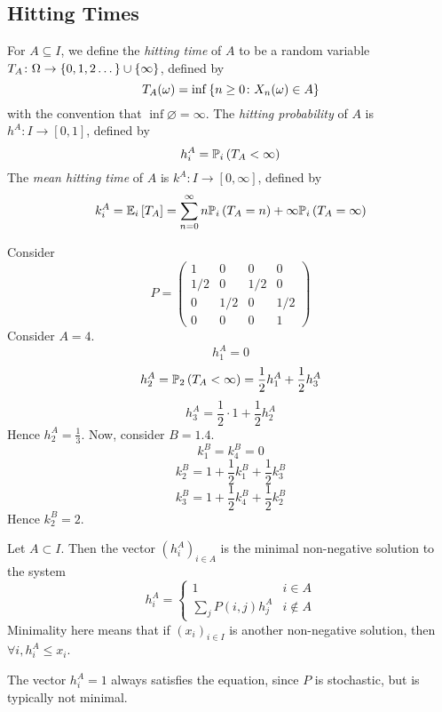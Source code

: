 \subsection{Hitting Times}
\begin{definition}
	For \( A \subseteq I \), we define the \textit{hitting time} of \( A \) to be a random variable \( T_A \colon \Omega \to \qty{0,1,2\dots} \cup \{ \infty \} \), defined by
	\[
		T_A(\omega) = \inf \qty{n \geq 0 \colon X_n(\omega) \in A}
	\]
	with the convention that \( \inf \varnothing = \infty \).
	The \textit{hitting probability} of \( A \) is \( h^A \colon I \to [0,1] \), defined by
	\[
		h_i^A = \mathbb{P}_{i}\left({T_A < \infty}\right)
	\]
	The \textit{mean hitting time} of \( A \) is \( k^A \colon I \to [0,\infty] \), defined by
	\[
		k_i^A = \mathbb{E}_{i}\left[{T_A}\right] = \sum_{n=0}^\infty n \mathbb{P}_{i}\left({T_A = n}\right) + \infty \mathbb{P}_{i}\left({T_A = \infty}\right)
	\]
\end{definition}
\begin{example}
	Consider
	\[
		P = \begin{pmatrix}
			1   & 0   & 0   & 0   \\
			1/2 & 0   & 1/2 & 0   \\
			0   & 1/2 & 0   & 1/2 \\
			0   & 0   & 0   & 1
		\end{pmatrix}
	\]
	Consider \( A = \qty{4} \).
	\[
		h_1^A = 0
	\]
	\[
		h_2^A = \mathbb{P}_{2}\left({T_A < \infty}\right) = \frac{1}{2} h_1^A + \frac{1}{2} h_3^A
	\]
	\[
		h_3^A = \frac{1}{2} \cdot 1 + \frac{1}{2} h_2^A
	\]
	Hence \( h_2^A = \frac{1}{3} \).
	Now, consider \( B = \qty{1,4} \).
	\[
		k_1^B = k_4^B = 0
	\]
	\[
		k_2^B = 1 + \frac{1}{2} k_1^B + \frac{1}{2} k_3^B
	\]
	\[
		k_3^B = 1 + \frac{1}{2} k_4^B + \frac{1}{2} k_2^B
	\]
	Hence \( k_2^B = 2 \).
\end{example}
\begin{theorem}
	Let \( A \subset I \).
	Then the vector \( (h_i^A)_{i \in A} \) is the minimal non-negative solution to the system
	\[
		h_i^A = \begin{cases}
			1                   & i \in A     \\
			\sum_j P(i,j) h_j^A & i \not\in A\end{cases}
	\]
	Minimality here means that if \( (x_i)_{i \in I} \) is another non-negative solution, then \( \forall i, h_i^A \leq x_i \).
\end{theorem}
\begin{note}
	The vector \( h_i^A = 1 \) always satisfies the equation, since \( P \) is stochastic, but is typically not minimal.
\end{note}
